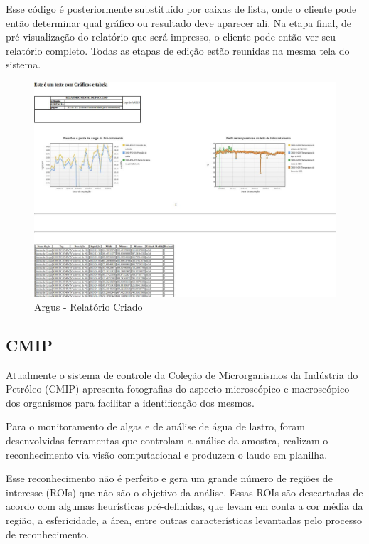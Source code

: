 \documentclass[]{article}
\begin{document}
Esse código é posteriormente substituído por caixas de lista, onde o cliente pode então determinar qual gráfico ou resultado deve aparecer ali. Na etapa final, de pré-visualização do relatório que será impresso, o cliente pode então ver seu relatório completo. Todas as etapas de edição estão reunidas na mesma tela do sistema.

\begin{figure}[!ht]
\centering
\includegraphics[scale=.5]{./argus_relatorio_criado}
\caption{Argus - Relatório Criado}
\label{fig:argus_relatorio_criado}
\end{figure}

\clearpage{}

\subsection{CMIP} 

Atualmente o sistema de controle da Coleção de Microrganismos da Indústria do Petróleo (CMIP) apresenta fotografias do aspecto microscópico e macroscópico dos organismos para facilitar a identificação dos mesmos.

Para o monitoramento de algas e de análise de água de lastro, foram desenvolvidas ferramentas que controlam a análise da amostra, realizam o reconhecimento via visão computacional e produzem o laudo em planilha. 

Esse reconhecimento não é perfeito e gera um grande número de regiões de interesse (ROIs) que não são o objetivo da análise. Essas ROIs são descartadas de acordo com algumas heurísticas pré-definidas, que levam em conta a cor média da região, a esfericidade, a área, entre outras características levantadas pelo processo de reconhecimento. 
\end{document}

